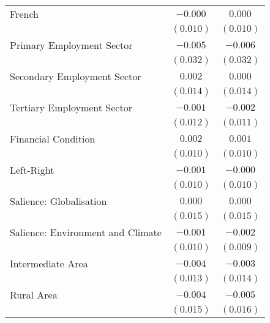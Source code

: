 \begin{center}
\begin{tiny}
\begin{longtable}{l@{} c@{} c@{}}
\quad French                                             & $-0.000$        & $0.000$        \\
                                                         & $(0.010)$       & $(0.010)$      \\
\quad Primary Employment Sector                          & $-0.005$        & $-0.006$       \\
                                                         & $(0.032)$       & $(0.032)$      \\
\quad Secondary Employment Sector                        & $0.002$         & $0.000$        \\
                                                         & $(0.014)$       & $(0.014)$      \\
\quad Tertiary Employment Sector                         & $-0.001$        & $-0.002$       \\
                                                         & $(0.012)$       & $(0.011)$      \\
\quad Financial Condition                                & $0.002$         & $0.001$        \\
                                                         & $(0.010)$       & $(0.010)$      \\
\quad Left-Right                                         & $-0.001$        & $-0.000$       \\
                                                         & $(0.010)$       & $(0.010)$      \\
\quad Salience: Globalisation                            & $0.000$         & $0.000$        \\
                                                         & $(0.015)$       & $(0.015)$      \\
\quad Salience: Environment and Climate                  & $-0.001$        & $-0.002$       \\
                                                         & $(0.010)$       & $(0.009)$      \\
\quad Intermediate Area                                  & $-0.004$        & $-0.003$       \\
                                                         & $(0.013)$       & $(0.014)$      \\
\quad Rural Area                                         & $-0.004$        & $-0.005$       \\
                                                         & $(0.015)$       & $(0.016)$      \\

\end{longtable}
\end{tiny}
\end{center}
